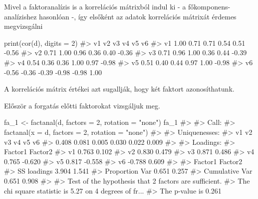\documentclass[
  letterpaper,
]{krantz}
\makeatletter
\newenvironment{Shaded}{\begin{snugshade}}{\end{snugshade}}
\newcommand{\AttributeTok}[1]{\textcolor[rgb]{0.40,0.45,0.13}{#1}}
\newcommand{\CommentTok}[1]{\textcolor[rgb]{0.37,0.37,0.37}{#1}}
\newcommand{\DecValTok}[1]{\textcolor[rgb]{0.68,0.00,0.00}{#1}}
\newcommand{\FunctionTok}[1]{\textcolor[rgb]{0.28,0.35,0.67}{#1}}
\newcommand{\NormalTok}[1]{\textcolor[rgb]{0.00,0.23,0.31}{#1}}
\newcommand{\OtherTok}[1]{\textcolor[rgb]{0.00,0.23,0.31}{#1}}
\newcommand{\StringTok}[1]{\textcolor[rgb]{0.13,0.47,0.30}{#1}}
\newenvironment{kframe}{%
\medskip{}
\setlength{\fboxsep}{.8em}
 \def\at@end@of@kframe{}%
 \ifinner\ifhmode%
  \def\at@end@of@kframe{\end{minipage}}%
  \begin{minipage}{\columnwidth}%
 \fi\fi%
 \def\FrameCommand##1{\hskip\@totalleftmargin \hskip-\fboxsep
 \colorbox{shadecolor}{##1}\hskip-\fboxsep
     \hskip-\linewidth \hskip-\@totalleftmargin \hskip\columnwidth}%
 \MakeFramed {\advance\hsize-\width
   \@totalleftmargin\z@ \linewidth\hsize
   \@setminipage}}%
 {\par\unskip\endMakeFramed%
 \at@end@of@kframe}
\renewenvironment{Shaded}{\begin{kframe}}{\end{kframe}}
\makeatother
\begin{document}
Mivel a faktoranalízis is a korrelációs mátrixból indul ki - a
főkomponens-analízishez hasonlóan -, így elsőként az adatok korrelációs
mátrixát érdemes megvizsgálni

\begin{Shaded}
\begin{Highlighting}[]
\FunctionTok{print}\NormalTok{(}\FunctionTok{cor}\NormalTok{(d), }\AttributeTok{digits =} \DecValTok{2}\NormalTok{)}
\CommentTok{\#\textgreater{}       v1    v2    v3    v4    v5    v6}
\CommentTok{\#\textgreater{} v1  1.00  0.71  0.71  0.54  0.51 {-}0.56}
\CommentTok{\#\textgreater{} v2  0.71  1.00  0.96  0.36  0.40 {-}0.36}
\CommentTok{\#\textgreater{} v3  0.71  0.96  1.00  0.36  0.44 {-}0.39}
\CommentTok{\#\textgreater{} v4  0.54  0.36  0.36  1.00  0.97 {-}0.98}
\CommentTok{\#\textgreater{} v5  0.51  0.40  0.44  0.97  1.00 {-}0.98}
\CommentTok{\#\textgreater{} v6 {-}0.56 {-}0.36 {-}0.39 {-}0.98 {-}0.98  1.00}
\end{Highlighting}
\end{Shaded}

A korrelációs mátrix értékei azt sugallják, hogy két faktort
azonosíthatunk.

Először a forgatás előtti faktorokat vizsgáljuk meg.

\begin{Shaded}
\begin{Highlighting}[]
\NormalTok{fa\_1 }\OtherTok{\textless{}{-}} \FunctionTok{factanal}\NormalTok{(d, }\AttributeTok{factors =} \DecValTok{2}\NormalTok{, }\AttributeTok{rotation =} \StringTok{"none"}\NormalTok{)}
\NormalTok{fa\_1}
\CommentTok{\#\textgreater{} }
\CommentTok{\#\textgreater{} Call:}
\CommentTok{\#\textgreater{} factanal(x = d, factors = 2, rotation = "none")}
\CommentTok{\#\textgreater{} }
\CommentTok{\#\textgreater{} Uniquenesses:}
\CommentTok{\#\textgreater{}    v1    v2    v3    v4    v5    v6 }
\CommentTok{\#\textgreater{} 0.408 0.081 0.005 0.030 0.022 0.009 }
\CommentTok{\#\textgreater{} }
\CommentTok{\#\textgreater{} Loadings:}
\CommentTok{\#\textgreater{}    Factor1 Factor2}
\CommentTok{\#\textgreater{} v1  0.763   0.102 }
\CommentTok{\#\textgreater{} v2  0.830   0.479 }
\CommentTok{\#\textgreater{} v3  0.871   0.486 }
\CommentTok{\#\textgreater{} v4  0.765  {-}0.620 }
\CommentTok{\#\textgreater{} v5  0.817  {-}0.558 }
\CommentTok{\#\textgreater{} v6 {-}0.788   0.609 }
\CommentTok{\#\textgreater{} }
\CommentTok{\#\textgreater{}                Factor1 Factor2}
\CommentTok{\#\textgreater{} SS loadings      3.904   1.541}
\CommentTok{\#\textgreater{} Proportion Var   0.651   0.257}
\CommentTok{\#\textgreater{} Cumulative Var   0.651   0.908}
\CommentTok{\#\textgreater{} }
\CommentTok{\#\textgreater{} Test of the hypothesis that 2 factors are sufficient.}
\CommentTok{\#\textgreater{} The chi square statistic is 5.27 on 4 degrees of fr...}
\CommentTok{\#\textgreater{} The p{-}value is 0.261}
\end{Highlighting}
\end{Shaded}
\end{document}
